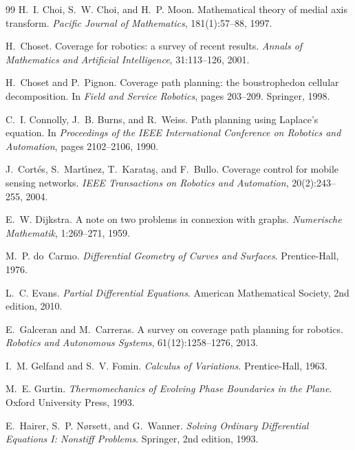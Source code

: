 \documentclass[11pt,a4paper]{article}
\numberwithin{equation}{section}
\theoremstyle{plain}
\theoremstyle{definition}
\theoremstyle{remark}
\begin{document}
\begin{thebibliography}{99}
H.~I. Choi, S.~W. Choi, and H.~P. Moon.
\newblock Mathematical theory of medial axis transform.
\newblock \emph{Pacific Journal of Mathematics}, 181(1):57--88, 1997.

H.~Choset.
\newblock Coverage for robotics: a survey of recent results.
\newblock \emph{Annals of Mathematics and Artificial Intelligence}, 31:113--126, 2001.

H.~Choset and P.~Pignon.
\newblock Coverage path planning: the boustrophedon cellular decomposition.
\newblock In \emph{Field and Service Robotics}, pages 203--209. Springer, 1998.

C.~I. Connolly, J.~B. Burns, and R.~Weiss.
\newblock Path planning using Laplace's equation.
\newblock In \emph{Proceedings of the IEEE International Conference on Robotics and Automation}, pages 2102--2106, 1990.

J.~Cort\'es, S.~Mart\'{\i}nez, T.~Karata\c{s}, and F.~Bullo.
\newblock Coverage control for mobile sensing networks.
\newblock \emph{IEEE Transactions on Robotics and Automation}, 20(2):243--255, 2004.

E.~W. Dijkstra.
\newblock A note on two problems in connexion with graphs.
\newblock \emph{Numerische Mathematik}, 1:269--271, 1959.

M.~P. do~Carmo.
\newblock \emph{Differential Geometry of Curves and Surfaces}.
\newblock Prentice-Hall, 1976.

L.~C. Evans.
\newblock \emph{Partial Differential Equations}.
\newblock American Mathematical Society, 2nd edition, 2010.

E.~Galceran and M.~Carreras.
\newblock A survey on coverage path planning for robotics.
\newblock \emph{Robotics and Autonomous Systems}, 61(12):1258--1276, 2013.

I.~M. Gelfand and S.~V. Fomin.
\newblock \emph{Calculus of Variations}.
\newblock Prentice-Hall, 1963.

M.~E. Gurtin.
\newblock \emph{Thermomechanics of Evolving Phase Boundaries in the Plane}.
\newblock Oxford University Press, 1993.

E.~Hairer, S.~P. N{\o}rsett, and G.~Wanner.
\newblock \emph{Solving Ordinary Differential Equations I: Nonstiff Problems}.
\newblock Springer, 2nd edition, 1993.


\end{thebibliography}
\end{document}
